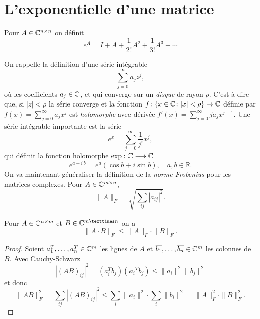 \section{L'exponentielle d'une matrice}
\label{sec:lexp-dune-matr}


\begin{definition}
  \label{def:28}
  Pour $A \in \mathbb{C}^{n \times n}$ on définit 
  \begin{displaymath}
    e^A = I + A + \frac{1}{2!} A^2 + \frac{1}{3!}A^3 + \cdots 
  \end{displaymath}
\end{definition}

\noindent On rappelle la définition d'une série intégrable 
\begin{displaymath}
  \sum_{j=0}^\infty a_j z^j,
\end{displaymath}
où les coefficients $a_j \in\mathbb{C}$, et
qui converge sur un \emph{disque} de rayon $\rho$. C'est à dire que, si $|z|< \rho$ la série converge et la fonction $f\colon \{x \in \mathbb{C} \colon |x| < \rho \}  \rightarrow \mathbb{C}$ définie par $f(x) = \sum_{j=0}^\infty a_j x^j $ est \emph{holomorphe} avec dérivée $f'(x) =  \sum_{j=0}^\infty j a_j x^{j-1}$. 
Une série intégrable importante est la série
\begin{displaymath}
  e^{x} = \sum_{j=0}^\infty \frac{1}{j!} x^j,
\end{displaymath}
qui définit la fonction holomorphe $\exp: \mathbb{C} \longrightarrow \mathbb{C}$ 
\begin{displaymath}
  e^{a+i\,b} = e^a (\cos b + i \sin b), \quad   a,b ∈ ℝ. 
\end{displaymath}
%
\noindent On va maintenant généraliser la définition de la \emph{norme Frobenius} pour les matrices complexes. Pour $A \in \mathbb{C}^{m\times n}$, 
\begin{displaymath}
  \|A\|_F = \sqrt{\sum_{ij} |a_{ij}|^2 }. 
\end{displaymath}

\begin{lemma}
  \label{lem:16}
  Pour $A \in \mathbb{C}^{n \times m}$ et $B \in \C^{m × n}$  on a 
  \begin{displaymath}
    \|A\cdot B\|_F \leq \|A\|_F\cdot \|B\|_F. 
  \end{displaymath}
\end{lemma}

  \begin{proof}Soient $a_1^T,\dots,a_n^T \in \mathbb{C}^m$ les lignes de $A$ et $\overline{b_1},\dots,\overline{b_n} \in \mathbb{C}^m$ les colonnes de $B$. Avec Cauchy-Schwarz 
    \begin{displaymath}
          |(AB)_{ij}|^2 = (a_i^T \overline{b_j})(\overline{a_i}^T b_j)  \leq \|a_i\|^2 \|b_j\|^2
    \end{displaymath}
et donc 
\begin{displaymath}
  \|AB\|_F^2 = \sum_{ij} |(AB)_{ij}|^2 \leq \sum_i\|a_i\|^2 \cdot \sum_i \|b_i\|^2 = \|A\|_F^2 \cdot \|B\|_F^2. 
\end{displaymath}
  \end{proof}


